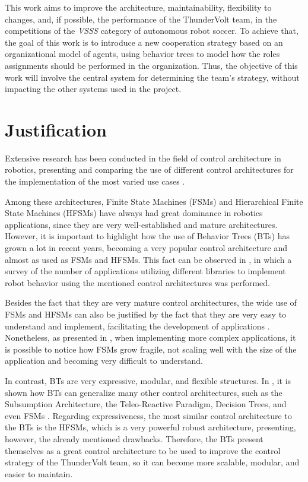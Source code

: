 This work aims to improve the architecture, maintainability, flexibility to changes, and, if possible, the performance of the ThunderVolt team, in the competitions of the \textit{VSSS} category of autonomous robot soccer. To achieve that, the goal of this work is to introduce a new cooperation strategy based on an organizational model \cite{Moise} of agents, using behavior trees to model how the roles assignments should be performed in the organization. Thus, the objective of this work will involve the central system for determining the team's strategy, without impacting the other systems used in the project.

\section{Justification}

Extensive research has been conducted in the field of control architecture in robotics, presenting and comparing the use of different control architectures for the implementation of the most varied use cases \cite{BTsInRobotics, SurveyBTs, Expressiveness, iovino2022programming, RobotArchitectureInDynamicEnvironment, PetriNetsRobotics, billington2010plausible, BTsAndFSMApplications}.

Among these architectures, Finite State Machines (FSMs) and Hierarchical Finite State Machines (HFSMs) have always had great dominance in robotics applications, since they are very well-established and mature architectures. However, it is important to highlight how the use of Behavior Trees (BTs) has grown a lot in recent years, becoming a very popular control architecture and almost as used as FSMs and HFSMs. This fact can be observed in \cite{BTsAndFSMApplications}, in which a survey of the number of applications utilizing different libraries to implement robot behavior using the mentioned control architectures was performed.

Besides the fact that they are very mature control architectures, the wide use of FSMs and HFSMs can also be justified by the fact that they are very easy to understand and implement, facilitating the development of applications \cite{BTsInRobotics, Expressiveness, iovino2022programming}. Nonetheless, as presented in \cite{BTsInRobotics, SurveyBTs, iovino2022programming}, when implementing more complex applications, it is possible to notice how FSMs grow fragile, not scaling well with the size of the application and becoming very difficult to understand.

In contrast, BTs are very expressive, modular, and flexible structures. In \cite{BTsInRobotics}, it is shown how BTs can generalize many other control architectures, such as the Subsumption Architecture, the Teleo-Reactive Paradigm, Decision Trees, and even FSMs \cite{BTsInRobotics, Expressiveness,  iovino2022programming}. Regarding expressiveness, the most similar control architecture to the BTs is the HFSMs, which is a very powerful robust architecture, presenting, however, the already mentioned drawbacks. Therefore, the BTs present themselves as a great control architecture to be used to improve the control strategy of the ThunderVolt team, so it can become more scalable, modular, and easier to maintain.

